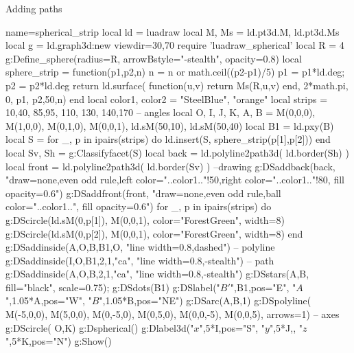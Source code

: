\begin{demo}{Adding paths}
\begin{luadraw}{name=spherical_strip}
local ld = luadraw
local M, Ms = ld.pt3d.M, ld.pt3d.Ms
local g = ld.graph3d:new{ viewdir={30,70} }
require 'luadraw_spherical'
local R = 4
g:Define_sphere({radius=R, arrowBstyle="-stealth", opacity=0.8})
local sphere_strip = function(p1,p2,n)
    n = n or math.ceil((p2-p1)/5)
    p1 = p1*ld.deg; p2 = p2*ld.deg
    return ld.surface( function(u,v) return Ms(R,u,v) end, 2*math.pi, 0, p1, p2,{50,n})
end
local color1, color2 = "SteelBlue", "orange"
local strips ={ {10,40}, {85,95}, {110, 130}, {140,170} } -- angles
local O, I, J, K, A, B = M(0,0,0), M(1,0,0), M(0,1,0), M(0,0,1), ld.sM(50,10), ld.sM(50,40)
local B1 = ld.pxy(B)
local S = {}
for _, p in ipairs(strips) do
    ld.insert(S, sphere_strip(p[1],p[2]))
end
local Sv, Sh = g:Classifyfacet(S)
local back = ld.polyline2path3d( ld.border(Sh) )
local front = ld.polyline2path3d( ld.border(Sv) )
--drawing
g:DSaddback(back, "draw=none,even odd rule,left color="..color1.."!50,right color="..color1.."!80, fill opacity=0.6")
g:DSaddfront(front, "draw=none,even odd rule,ball color="..color1..", fill opacity=0.6")  
for _, p in ipairs(strips) do
    g:DScircle({ld.sM(0,p[1]), M(0,0,1)}, {color="ForestGreen", width=8})
    g:DScircle({ld.sM(0,p[2]), M(0,0,1)}, {color="ForestGreen", width=8})
end
g:DSaddinside({A,O,B,B1,O}, "line width=0.8,dashed") -- polyline
g:DSaddinside({I,O,B1,2,1,"ca"}, "line width=0.8,-stealth") -- path
g:DSaddinside({A,O,B,2,1,"ca"}, "line width=0.8,-stealth")
g:DSstars({A,B}, {fill="black", scale=0.75}); g:DSdots(B1)
g:DSlabel("$B'$",B1,{pos="E"}, "$A$",1.05*A,{pos="W"}, "$B$",1.05*B,{pos="NE"})
g:DSarc({A,B},1)
g:DSpolyline( {{M(-5,0,0), M(5,0,0)}, {M(0,-5,0), M(0,5,0)}, {M(0,0,-5), M(0,0,5)}}, {arrows=1}) -- axes
g:DScircle( {O,K})
g:Dspherical()
g:Dlabel3d("$x$",5*I,{pos="S"}, "$y$",5*J,{}, "$z$",5*K,{pos="N"})
g:Show()
\end{luadraw}
\end{demo}

